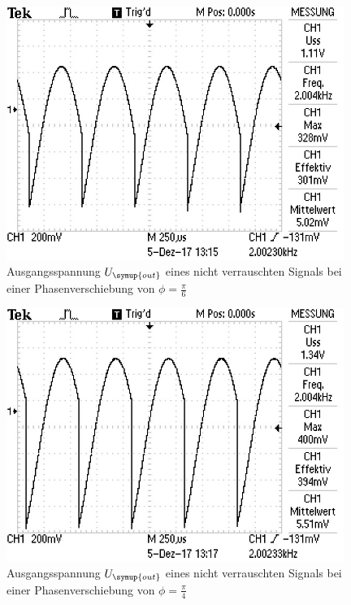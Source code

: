 \begin{figure}
  \centering
  \includegraphics[width=11cm]{data/phase_30.jpg}
  \caption{Ausgangsspannung $U_{\symup{out}}$ eines nicht verrauschten Signals bei einer Phasenverschiebung
  von $\phi=\frac{\pi}{6}$}
  \label{fig:phase_30}
\end{figure}

\begin{figure}
  \centering
  \includegraphics[width=11cm]{data/phase_45.jpg}
  \caption{Ausgangsspannung $U_{\symup{out}}$ eines nicht verrauschten Signals bei einer Phasenverschiebung
  von $\phi=\frac{\pi}{4}$}
  \label{fig:phase_45}
\end{figure}

